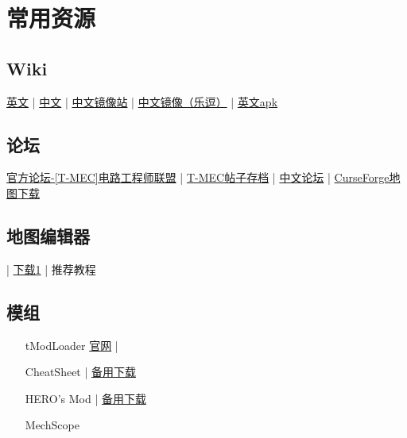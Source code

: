 \chapter{常用资源}\label{app1}

\section{Wiki}\label{app2}
\href{https://terraria.gamepedia.com/Terraria_Wiki}{英文} | \href{https://terraria-zh.gamepedia.com/Terraria_Wiki}{中文} | \href{http://terraria.1tu.me/}{中文镜像站} | \href{http://trwiki.uu.cc/}{中文镜像（乐逗）} | \href{https://terraria-wiki.fileplanet.com/apk/download#}{英文apk}

\section{论坛}
\href{https://forums.terraria.org/index.php?forums/t-mec-terraria-mechanical-engineering-corps.194/}{官方论坛-[T-MEC]电路工程师联盟} | \href{https://github.com/putianyi889/TMECbackup}{T-MEC帖子存档} | \href{https://www.bbstr.net/}{中文论坛} | \href{https://www.curseforge.com/terraria/maps}{CurseForge地图下载}

\section{地图编辑器}\label{app3}
 | \href{http://www.binaryconstruct.com/downloads/}{下载1} | 推荐教程

\section{模组}
\begin{itemize}
\item[tModLoader]\label{app4} \href{https://www.tmodloader.net/}{官网} | 
\item[CheatSheet]\label{app5}  | \href{http://javid.ddns.net/tModLoader/download.php?Down=mods/CheatSheet.tmod}{备用下载}
\item[HERO's Mod]\label{app6}  | \href{http://javid.ddns.net/tModLoader/download.php?Down=mods/HEROsMod.tmod}{备用下载}
\item[MechScope]\label{app7} 
\end{itemize}

